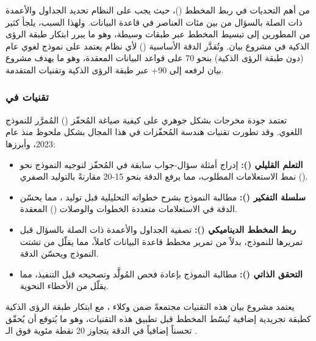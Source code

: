 من أهم التحديات في  ربط المخطط ()، حيث يجب
على النظام تحديد الجداول والأعمدة ذات الصلة بالسؤال من بين مئات العناصر في
قاعدة البيانات. ولهذا السبب، يلجأ كثير من المطورين إلى تبسيط المخطط عبر طبقات
وسيطة، وهو ما يبرر ابتكار طبقة الرؤى الذكية في مشروع بيان. وتُقدَّر
الدقة الأساسية () لأي نظام  يعتمد على نموذج لغوي
عام (دون طبقة الرؤى الذكية) بنحو 70\LR{\%} على قواعد البيانات المعقدة، وهو ما
يهدف مشروع بيان لرفعه إلى 90\LR{\%}+ عبر طبقة الرؤى الذكية وتقنيات
 المتقدمة.

\subsubsection{تقنيات  في }
\label{subsubsec:prompt-eng}

تعتمد جودة مخرجات  بشكل جوهري على كيفية صياغة المُحفّز
() المُمرَّر للنموذج اللغوي. وقد تطورت تقنيات هندسة المُحفّزات في
هذا المجال بشكل ملحوظ منذ عام 2023، وأبرزها:

\begin{itemize}[label=\textcolor{kauprimary}{$\blacktriangleright$},leftmargin=*]
  \item \textbf{التعلم القليلي ():} إدراج أمثلة سؤال-جواب
        سابقة في المُحفّز لتوجيه النموذج نحو نمط الاستعلامات المطلوب، مما يرفع
        الدقة بنحو 15-20\LR{\%} مقارنةً بالتوليد الصفري ().
  \item \textbf{سلسلة التفكير ():} مطالبة النموذج
        بشرح خطواته التحليلية قبل توليد ، مما يحسّن الدقة في الاستعلامات
        متعددة الخطوات والوصلات () المعقدة.
  \item \textbf{ربط المخطط الديناميكي ():} تصفية
        الجداول والأعمدة ذات الصلة بالسؤال قبل تمريرها للنموذج، بدلاً من تمرير
        مخطط قاعدة البيانات كاملاً، مما يقلّل من تشتت النموذج ويحسّن الدقة.
  \item \textbf{التحقق الذاتي ():} مطالبة النموذج بإعادة
        فحص  المُولَّد وتصحيحه قبل التنفيذ، مما يقلّل من الأخطاء
        النحوية.
\end{itemize}

يعتمد مشروع بيان هذه التقنيات مجتمعةً ضمن وكلاء ، مع ابتكار
طبقة الرؤى الذكية كطبقة تجريدية إضافية تُبسّط المخطط قبل تطبيق هذه
التقنيات، وهو ما يُتوقع أن يُحقّق تحسناً إضافياً في الدقة يتجاوز 20 نقطة
مئوية فوق الـ .


